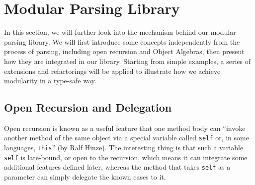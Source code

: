 \section{Modular Parsing Library}\label{sec:library}


In this section, we will further look into the mechanism behind our modular parsing library.
We will first introduce some concepts independently from the process of parsing, including open recursion and Object Algebras,
then present how they are integrated in our library.
Starting from simple examples, a series of extensions and refactorings will be applied to illustrate
how we achieve modularity in a type-safe way.

\subsection{Open Recursion and Delegation}\label{subsec:openrecursion}

Open recursion is known as a useful feature that one method body can ``invoke another method of the same object via a special variable called \lstinline{self} or, in some languages, \lstinline[keywords={}]{this}'' (by Ralf Hinze). The interesting thing is that such a variable \lstinline{self} is late-bound, or open to the recursion, which means it can integrate some additional features defined later, whereas the method that takes \lstinline{self} as a parameter can simply delegate the known cases to it.

